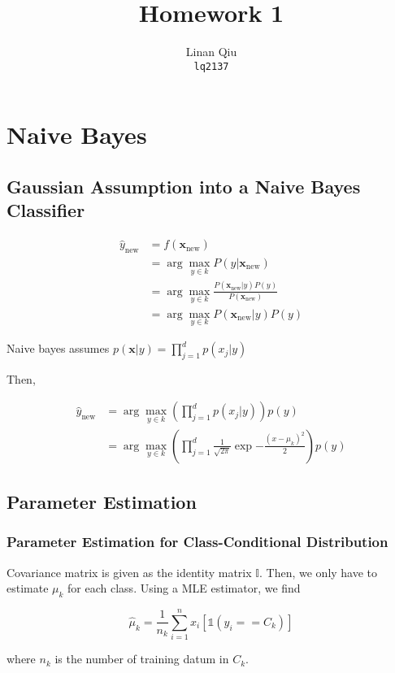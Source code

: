 \documentclass[11pt]{scrartcl}
\title{Homework 1}
\author{Linan Qiu\\\texttt{lq2137}}
\begin{document}
\maketitle

\section{Naive Bayes}

\subsection{Gaussian Assumption into a Naive Bayes Classifier}

\begin{align*}
\hat{y}_{\mathrm{new}} &= f(\mathbf{x}_{\mathrm{new}}) \\
&= \arg\max_{y \in k} P(y | \mathbf{x_\mathrm{new}}) \\
&= \arg\max_{y \in k} \frac{P(\mathbf{x_\mathrm{new}}|y)P(y)}{P(\mathbf{x_\mathrm{new}})} \\
&= \arg\max_{y \in k} P(\mathbf{x_\mathrm{new}}|y)P(y)
\end{align*}

Naive bayes assumes $p(\mathbf{x}|y) = \prod_{j=1}^d p(x_j|y)$

Then,

\begin{align*}
\hat{y}_{\mathrm{new}} &= \arg\max_{y \in k} \left(\prod_{j=1}^d p(x_j|y) \right) p(y) \\
&= \arg\max_{y \in k} \left(\prod_{j=1}^d \frac{1}{\sqrt{2\pi}}\exp{-\frac{(x-\mu_k)^2}{2}} \right) p(y)
\end{align*}

\subsection{Parameter Estimation}

\subsubsection{Parameter Estimation for Class-Conditional Distribution}

Covariance matrix is given as the identity matrix $\mathbb{I}$. Then, we only have to estimate $\mu_k$ for each class. Using a MLE estimator, we find 

\[\hat{\mu}_k = \frac{1}{n_k} \sum_{i=1}^{n} x_i \left[\mathds{1}(y_i == C_k)\right]\]

where $n_k$ is the number of training datum in $C_k$.
\end{document}
